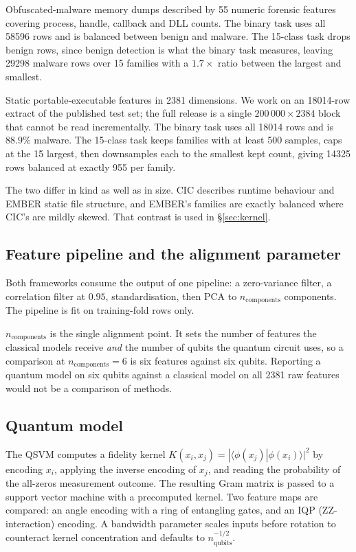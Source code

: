 \documentclass[11pt]{article}
\newcommand{\nc}{\ensuremath{n_{\mathrm{components}}}}
\begin{document}
\begin{description}[leftmargin=1.2em,style=nextline]
\item[CIC-MalMem-2022] Obfuscated-malware memory dumps described by 55 numeric
forensic features covering process, handle, callback and DLL counts. The binary
task uses all \num{58596} rows and is balanced between benign and malware. The
15-class task drops benign rows, since benign detection is what the binary task
measures, leaving \num{29298} malware rows over 15 families with a $1.7\times$
ratio between the largest and smallest.
\item[EMBER 2018] Static portable-executable features in 2381 dimensions. We work
on an \num{18014}-row extract of the published test set; the full release is a
single $200\,000 \times 2384$ block that cannot be read incrementally. The binary
task uses all \num{18014} rows and is $88.9\%$ malware. The 15-class task keeps
families with at least 500 samples, caps at the 15 largest, then downsamples each
to the smallest kept count, giving \num{14325} rows balanced at exactly 955 per
family.
\end{description}

The two differ in kind as well as in size. CIC describes runtime behaviour and
EMBER static file structure, and EMBER's families are exactly balanced where
CIC's are mildly skewed. That contrast is used in §\ref{sec:kernel}.

\subsection{Feature pipeline and the alignment parameter}

Both frameworks consume the output of one pipeline: a zero-variance filter, a
correlation filter at $0.95$, standardisation, then PCA to \nc{} components. The
pipeline is fit on training-fold rows only.

\nc{} is the single alignment point. It sets the number of features the classical
models receive \emph{and} the number of qubits the quantum circuit uses, so a
comparison at $\nc{}=6$ is six features against six qubits. Reporting a quantum
model on six qubits against a classical model on all 2381 raw features would not
be a comparison of methods.

\subsection{Quantum model}

The QSVM computes a fidelity kernel
$K(x_i,x_j) = |\langle \phi(x_j) | \phi(x_i) \rangle|^2$ by encoding $x_i$,
applying the inverse encoding of $x_j$, and reading the probability of the
all-zeros measurement outcome. The resulting Gram matrix is passed to a support
vector machine with a precomputed kernel. Two feature maps are compared: an angle
encoding with a ring of entangling gates, and an IQP (ZZ-interaction) encoding.
A bandwidth parameter scales inputs before rotation to counteract kernel
concentration and defaults to $n_{\mathrm{qubits}}^{-1/2}$.
\end{document}
